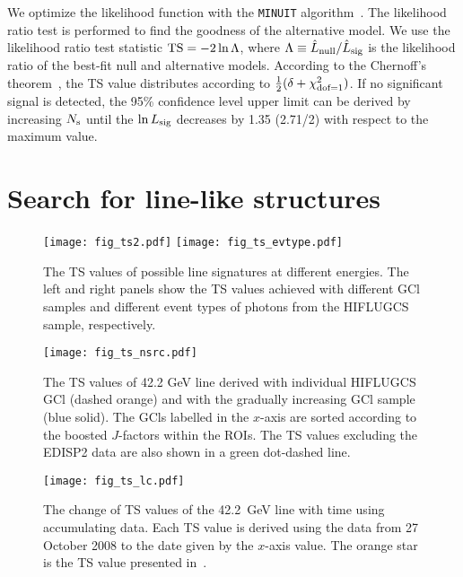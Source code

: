 \documentclass[
	twocolumn,
]{aastex6} %
\begin{document}
We optimize the likelihood function with the {\tt MINUIT} algorithm~\citep{MINUIT1975}.
The likelihood ratio test is performed to find the goodness of the alternative model.
We use the likelihood ratio test statistic ${\rm TS}=-2 \ln \Lambda$, where $\Lambda \equiv \hat{L}_{\rm null}/\hat{L}_{\rm sig}$ is the likelihood ratio of the best-fit null and alternative models.
According to the Chernoff's theorem~\citep{Chernoff1954}, the TS value distributes according to $\frac{1}{2} (\delta+\chi^2_{\rm dof=1})$.
If no significant signal is detected, the 95\% confidence level upper limit can be derived by increasing $N_{\rm s}$ until the $\ln L_{\rm sig}$ decreases by 1.35 (2.71/2) with respect to the maximum value.


\section{Search for line-like structures}\label{sec::line_search}

\begin{figure*}
    \centering
	\texttt{[image: fig\_ts2.pdf]}
	\texttt{[image: fig\_ts\_evtype.pdf]}
    \caption{\label{fig:ts}
		The TS values of possible line signatures at different energies.
		The left and right panels show the TS values achieved with different GCl samples and different event types of photons from the HIFLUGCS sample, respectively. %
    }
\end{figure*}

\begin{figure}
    \centering
	\texttt{[image: fig\_ts\_nsrc.pdf]}
    \caption{\label{fig:ts_nsrc}
		The TS values of 42.2 GeV line derived with individual HIFLUGCS GCl (dashed orange) and with the gradually increasing GCl sample (blue solid).
		The GCls labelled in the $x$-axis are sorted according to the boosted $J$-factors within the ROIs.
		The TS values excluding the EDISP2 data are also shown in a green dot-dashed line.
    }
\end{figure}

\begin{figure}
	\centering
	\texttt{[image: fig\_ts\_lc.pdf]}
    \caption{\label{fig:ts_lc}
		The change of TS values of the 42.2~GeV line with time using accumulating data.
		Each TS value is derived using the data from 27 October 2008 to the date given by the $x$-axis value.
		The orange star is the TS value presented in~\citet{Liang2016}.
    }
\end{figure}
\end{document}
